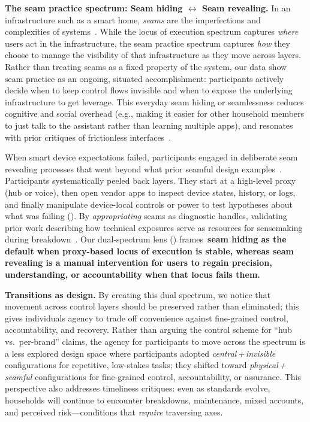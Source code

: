 \noindent\textbf{The seam practice spectrum: Seam hiding $\leftrightarrow$ Seam revealing.}
In an infrastructure such as a smart home, \textit{seams} are the imperfections and complexities of systems~\cite{madakam2014smart}. While the locus of execution spectrum captures \emph{where} users act in the infrastructure, the seam practice spectrum captures \emph{how} they choose to manage the visibility of that infrastructure as they move across layers. Rather than treating seams as a fixed property of the system, our data show seam practice as an ongoing, situated accomplishment: participants actively decide when to keep control flows invisible and when to expose the underlying infrastructure to get leverage. This everyday seam hiding or seamlessness reduces cognitive and social overhead (e.g., making it easier for other household members to just talk to the assistant rather than learning multiple apps), and resonates with prior critiques of frictionless interfaces~\cite{hengesbach2022undoing,inman2019beautiful}.

When smart device expectations failed, participants engaged in deliberate seam revealing processes that went beyond what prior seamful design examples~\cite{kuznetsov2012seams,chalmers2004social}. Participants systematically peeled back layers. They start at a high-level proxy (hub or voice), then open vendor apps to inspect device states, history, or logs, and finally manipulate device-local controls or power to test hypotheses about what was failing (). By \emph{appropriating} seams as diagnostic handles, validating prior work describing how technical exposures serve as resources for sensemaking during breakdown~\cite{dao2021bad, benford2006can}. Our dual-spectrum lens () frames~\textbf{seam hiding as the default when proxy-based locus of execution is stable, whereas seam revealing is a manual intervention for users to regain precision, understanding, or accountability when that locus fails them.}

\noindent\textbf{Transitions as design.} By creating this dual spectrum, we notice that movement across control layers should be preserved rather than eliminated; this gives individuals agency to trade off convenience against fine-grained control, accountability, and recovery. Rather than arguing the control scheme for ``hub vs.\ per-brand'' claims, the agency for participants to move across the spectrum is a less explored design space where participants adopted \emph{central\,+\,invisible} configurations for repetitive, low-stakes tasks; they shifted toward \emph{physical\,+\,seamful} configurations for fine-grained control, accountability, or assurance. This perspective also addresses timeliness critiques: even as standards evolve, households will continue to encounter breakdowns, maintenance, mixed accounts, and perceived risk---conditions that \emph{require} traversing axes.

